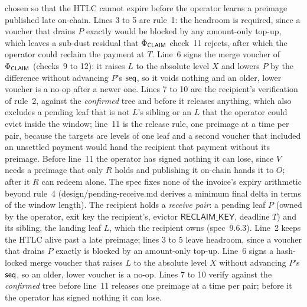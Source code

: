 {chosen so that the HTLC cannot expire before the operator learns a
preimage published late on-chain. Lines 3 to 5 are rule~1: the headroom is
required, since a voucher that drains $P$ exactly would be blocked by any
amount-only top-up, which leaves a sub-dust residual that
$\Phi_{\textsf{CLAIM}}$ check~11 rejects, after which the operator could
reclaim the payment at $T$. Line~6 signs the merge voucher of
$\Phi_{\textsf{CLAIM}}$ (checks~9 to 12): it raises $L$ to the absolute level
$X$ and lowers $P$ by the difference without advancing $P$'s $\mathsf{seq}$, so it
voids nothing and an older, lower voucher is a no-op after a newer one.
Lines 7 to 10 are the recipient's verification of rule~2, against the
\emph{confirmed} tree and before it releases anything, which also
excludes a pending leaf that is not $L$'s sibling or an $L$ that the
operator could evict inside the window; line~11 is the release rule, one
preimage at a time per pair, because the targets are levels of one leaf
and a second voucher that included an unsettled payment would hand the
recipient that payment without its preimage. Before line~11 the
operator has signed nothing it can lose, since $V$ needs a preimage that
only $R$ holds and publishing it on-chain hands it to $O$; after it $R$
can redeem alone. The spec fixes none of the invoice's expiry
arithmetic beyond rule~4 (design/pending-receive.md derives a minimum
final delta in terms of the window length).
\else
The recipient holds a \emph{receive pair}: a pending leaf $P$ (owned by
the operator, exit key the recipient's, evictor $\mathsf{RECLAIM\_KEY}$,
deadline $T$) and its sibling, the landing leaf $L$, which the recipient
owns (spec~9.6.3). Line~2 keeps the HTLC alive past a late preimage;
lines 3 to 5 leave headroom, since a voucher that drains $P$ exactly is
blocked by an amount-only top-up. Line~6 signs a hash-locked merge
voucher that raises $L$ to the absolute level $X$ without advancing
$P$'s $\mathsf{seq}$, so an older, lower voucher is a no-op. Lines 7 to 10 verify
against the \emph{confirmed} tree before line~11 releases one preimage at
a time per pair; before it the operator has signed nothing it can lose.
\fi
}

